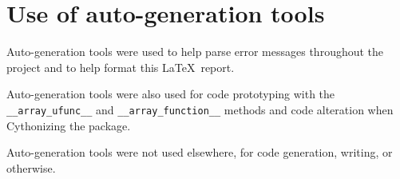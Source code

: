 \documentclass[11pt,a4paper]{article}
\begin{document}
\section{Use of auto-generation tools}
Auto-generation tools were used to help parse error messages throughout the project and to help format this \LaTeX\ report.

Auto-generation tools were also used for code prototyping with the \texttt{\_\_array\_ufunc\_\_} and \texttt{\_\_array\_function\_\_} methods and code alteration when Cythonizing the package.

Auto-generation tools were not used elsewhere, for code generation, writing, or otherwise.
\end{document}
